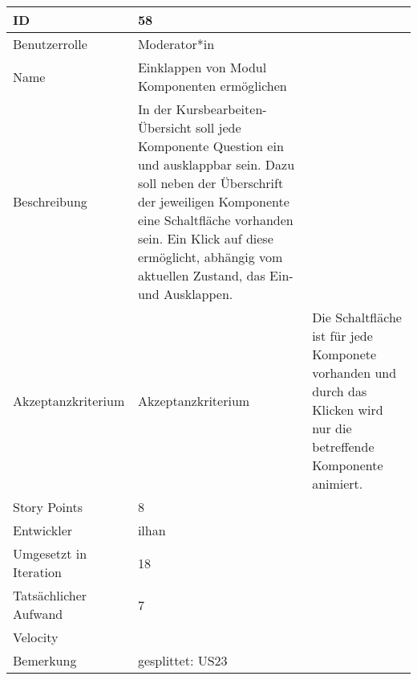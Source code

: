 \begin{tabularx}{\textwidth}{|p{}|X|}
	\hline
	ID & 58\\
	\hline
	Benutzerrolle & Moderator*in\\
	\hline
	Name & Einklappen von Modul Komponenten ermöglichen\\
	\hline
	Beschreibung & In der Kursbearbeiten-Übersicht soll jede Komponente Question ein und ausklappbar sein.
		Dazu soll neben der Überschrift der jeweiligen Komponente eine Schaltfläche vorhanden sein.
		Ein Klick auf diese ermöglicht, abhängig vom aktuellen Zustand, das Ein- und Ausklappen.\\
	\hline
	Akzeptanzkriterium & Akzeptanzkriterium & Die Schaltfläche ist für jede Komponete vorhanden und durch das Klicken wird nur die betreffende Komponente animiert.\\
	\hline
	Story Points & 8\\
	\hline
	Entwickler & ilhan\\
	\hline
	Umgesetzt in Iteration & 18\\ 
	\hline
	Tatsächlicher Aufwand & 7\\
	\hline
	Velocity & \\
	\hline
	Bemerkung & gesplittet: US23\\
	\hline
\end{tabularx}
\vspace{20pt}
